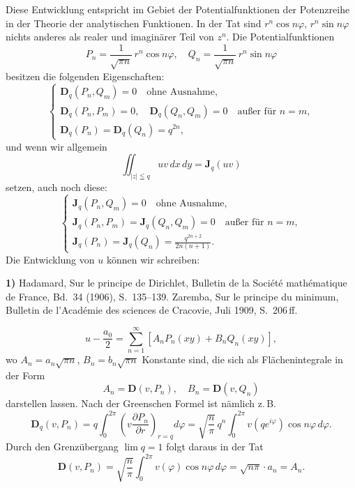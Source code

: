 \documentclass{article}
\begin{document}
Diese Entwicklung entspricht im Gebiet der Potentialfunktionen der Potenzreihe in der Theorie der analytischen Funktionen. In der Tat sind $r^n \cos n\varphi$, $r^n \sin n\varphi$ nichts anderes als realer und imaginärer Teil von $z^n$. Die Potentialfunktionen
\[ P_n = \frac{1}{\sqrt{\pi n}}\,r^n \cos n\varphi, \quad Q_n = \frac{1}{\sqrt{\pi n}}\,r^n \sin n\varphi \]
besitzen die folgenden Eigenschaften:
\[ \left\{
\begin{gathered}
\mathbf{D}_q(P_n, Q_m) = 0 \quad \text{ohne Ausnahme}, \\
\mathbf{D}_q(P_n, P_m) = 0, \quad \mathbf{D}_q(Q_n, Q_m) = 0 \quad \text{außer für } n = m, \\
\mathbf{D}_q(P_n) = \mathbf{D}_q(Q_n) = q^{2n},
\end{gathered}
\right. \tag{I} \]
und wenn wir allgemein
\[ \iint_{|z| \leqq q} u v\,dx\,dy = \mathbf{J}_q(uv) \]
setzen, auch noch diese:
\[ \left\{
\begin{gathered}
\mathbf{J}_q(P_n, Q_m) = 0 \quad \text{ohne Ausnahme}, \\
\mathbf{J}_q(P_n, P_m) = \mathbf{J}_q(Q_n, Q_m) = 0 \quad \text{außer für } n = m, \\
\mathbf{J}_q(P_n) = \mathbf{J}_q(Q_n) = \frac{q^{2n+2}}{2n(n+1)}.
\end{gathered}
\right. \tag{II} \]
Die Entwicklung von $u$ können wir schreiben:

\textbf{1)} Hadamard, Sur le principe de Dirichlet, Bulletin de la Société mathématique de France, Bd.~34 (1906), S.~135--139. Zaremba, Sur le principe du minimum, Bulletin de l'Académie des sciences de Cracovie, Juli 1909, S.~206\,ff.

\[ u - \frac{a_0}{2} = \sum_{n=1}^\infty [A_n P_n(xy) + B_n Q_n(xy)], \tag{17} \]
wo $A_n = a_n \sqrt{\pi n}$, $B_n = b_n \sqrt{\pi n}$ Konstante sind, die sich als Flächenintegrale in der Form
\[ A_n = \mathbf{D}(v, P_n), \quad B_n = \mathbf{D}(v, Q_n) \tag{18} \]
darstellen lassen. Nach der Greenschen Formel ist nämlich z.\,B.
\[ \mathbf{D}_q(v, P_n) = q \int_0^{2\pi} \left( v \frac{\partial P_n}{\partial r} \right)_{r=q} d\varphi = \sqrt{\frac{n}{\pi}}\,q^n \int_0^{2\pi} v(q e^{i\varphi}) \cos n\varphi\,d\varphi. \]
Durch den Grenzübergang $\lim q = 1$ folgt daraus in der Tat
\[ \mathbf{D}(v, P_n) = \sqrt{\frac{n}{\pi}} \int_0^{2\pi} v(\varphi) \cos n\varphi\,d\varphi = \sqrt{n\pi} \cdot a_n = A_n. \]
\end{document}
